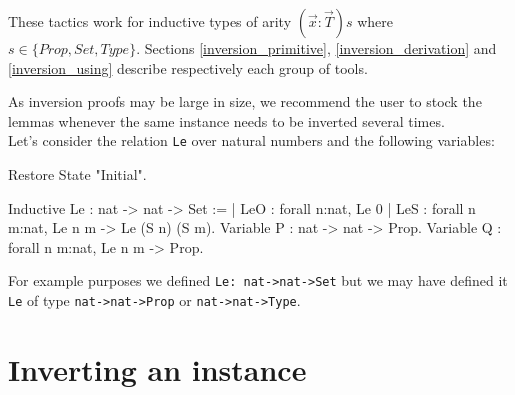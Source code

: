 These tactics work for inductive types of arity $(\vec{x}:\vec{T})s$ 
where $s \in \{Prop,Set,Type\}$. Sections \ref{inversion_primitive},
\ref{inversion_derivation} and \ref{inversion_using} 
describe respectively each group of tools.

As inversion proofs may be large in size, we recommend the user to
stock the lemmas whenever the same instance needs to be inverted
several times.\\

Let's consider the relation \texttt{Le} over natural numbers and the
following variables:

\begin{coq_eval}
Restore State "Initial".
\end{coq_eval}

\begin{coq_example*}
Inductive Le : nat -> nat -> Set :=
  | LeO : forall n:nat, Le 0%
  | LeS : forall n m:nat, Le n m -> Le (S n) (S m).
Variable P : nat -> nat -> Prop.
Variable Q : forall n m:nat, Le n m -> Prop.
\end{coq_example*}

For example purposes we defined  \verb+Le: nat->nat->Set+
 but we may have defined
it \texttt{Le} of type \verb+nat->nat->Prop+ or \verb+nat->nat->Type+.


\section[Inverting an instance]{Inverting an instance\label{inversion_primitive}}
